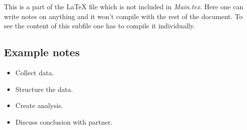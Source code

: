 This is a part of the \LaTeX{} file which is not included in \textit{Main.tex}. Here one can write notes on anything and it won't compile with the rest of the document. To see the content of this subfile one has to compile it individually.

\subsection{Example notes}
\begin{itemize}
    \item Collect data.
    \item Structure the data.
    \item Create analysis.
    \item Discuss conclusion with partner.
\end{itemize}
